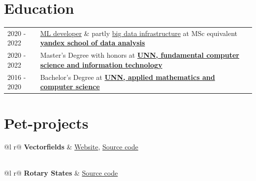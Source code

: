 \documentclass[a4paper,12pt]{article}
\begin{document}
\section{Education}
\begin{tabularx}{\linewidth}{@{}l X@{}}	
2020 - 2022 & \href{https://academy.yandex.com/dataschool/course/machine-learning}{ML developer} \& partly \href{https://academy.yandex.com/dataschool/course/big-data-infrastructure}{big data infrastructure} at MSc equivalent \textbf{\href{https://academy.yandex.com/dataschool/}{yandex school of data analysis}} \\
2020 - 2022 & Master's Degree with honors at \textbf{\href{https://itmm.unn.ru/obrazovanie/magistratura/iskusstvennyj-intellekt}{UNN, fundamental computer science and information technology}} \hfill \normalsize \\
2016 - 2020 & Bachelor's Degree at \textbf{\href{https://itmm.unn.ru/courses/pmi}{UNN, applied mathematics and computer science}} \\

\end{tabularx}

\section{Pet-projects}

\begin{tabularx}{\linewidth}{ @{}l r@{} }
    \textbf{Vectorfields} & \hfill \href{https://dimaamega.github.io/vectorfields/?x\_str=y\&y\_str=-L*y-sin(x)\&xspeed=3\&count=2000\&M\_Time\_Alive\_particle=3.95\&M\_n\_lines=24\&L=1\&skip\_welcome\&add\_scale=100}{Website},  \href{https://github.com/DimaAmega/vectorfields}{Source code} \\[3.75pt]
      \\
\end{tabularx}

\begin{tabularx}{\linewidth}{ @{}l r@{} }
    \textbf{Rotary States} & \hfill \href{https://github.com/unn-dynamic-systems/rotary_states}{Source code} \\[3.75pt]
     \\
\end{tabularx}
\end{document}
